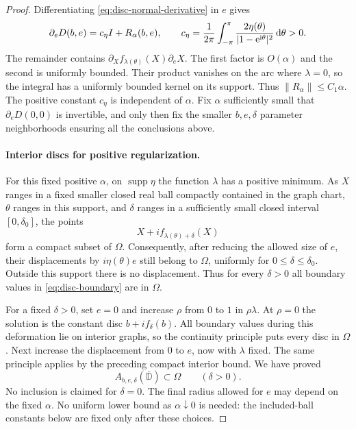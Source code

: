 \begin{proof}
Differentiating \eqref{eq:disc-normal-derivative} in $e$ gives
\[
 \partial_e D(b,e)=c_\eta I+R_\alpha(b,e),
 \qquad
 c_\eta=\frac{1}{2\pi}\int_{-\pi}^{\pi}
       \frac{2\eta(\theta)}{|1-\mathrm{e}^{\mathrm{i}\theta}|^2}\,\mathrm{d} \theta>0.
\]
The remainder contains $\partial_X f_{\lambda(\theta)}(X)\partial_e X$. The first factor is $O(\alpha)$ and the second is uniformly bounded. Their product vanishes on the arc where $\lambda=0$, so the integral has a uniformly bounded kernel on its support.  Thus $\|R_\alpha\|\le C_1\alpha$.  The positive constant $c_\eta$ is independent of $\alpha$.  Fix $\alpha$ sufficiently small that $\partial_e D(0,0)$ is invertible, and only then fix the smaller $b,e,\delta$ parameter neighborhoods ensuring all the conclusions above.

\paragraph{Interior discs for positive regularization.}
For this fixed positive $\alpha$, on $\operatorname{supp}\eta$ the function $\lambda$ has a positive minimum.  As $X$ ranges in a fixed smaller closed real ball compactly contained in the graph chart, $\theta$ ranges in this support, and $\delta$ ranges in a sufficiently small closed interval $[0,\delta_0]$, the points
\[
 X+i f_{\lambda(\theta)+\delta}(X)
\]
form a compact subset of $\Omega$.  Consequently, after reducing the allowed size of $e$, their displacements by $i\eta(\theta)e$ still belong to $\Omega$, uniformly for $0\le\delta\le\delta_0$. Outside this support there is no displacement.  Thus for every $\delta>0$ all boundary values in \eqref{eq:disc-boundary} are in $\Omega$.

For a fixed $\delta>0$, set $e=0$ and increase $\rho$ from $0$ to $1$ in $\rho\lambda$.  At $\rho=0$ the solution is the constant disc $b+i f_\delta(b)$.  All boundary values during this deformation lie on interior graphs, so the continuity principle puts every disc in $\Omega$.  Next increase the displacement from $0$ to $e$, now with $\lambda$ fixed.  The same principle applies by the preceding compact interior bound.  We have proved
\begin{equation}\label{eq:positive-discs}
 A_{b,e,\delta}(\overline{\mathbb{D}})\subset\Omega
 \qquad(\delta>0).
\end{equation}
No inclusion is claimed for $\delta=0$. The final radius allowed for $e$ may depend on the fixed $\alpha$. No uniform lower bound as $\alpha\downarrow0$ is needed: the included-ball constants below are fixed only after these choices.


\end{proof}
